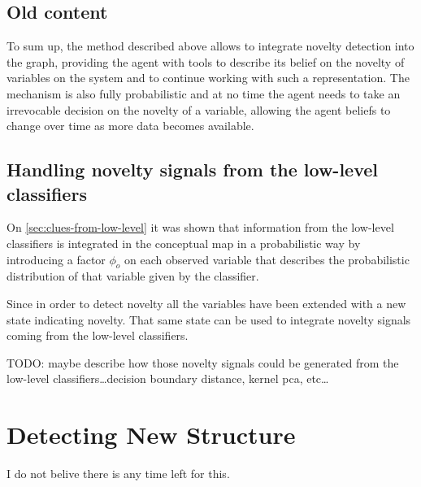 \subsection{Old content}
To sum up, the method described above allows to integrate novelty detection
into the graph, providing the agent with tools to describe its belief on the
novelty of variables on the system and to continue working with such a
representation. The mechanism is also fully probabilistic and at no time
the agent needs to take an irrevocable decision on the novelty of a variable,
allowing the agent beliefs to change over time as more data becomes available.


\subsection{Handling novelty signals from the low-level classifiers}
On \autoref{sec:clues-from-low-level} it was shown that information from the
low-level classifiers is integrated in the conceptual map in a probabilistic
way by introducing a factor $\phi_o$ on each observed variable that describes
the probabilistic distribution of that variable given by the classifier.

Since in order to detect novelty all the variables have been extended with a
new state indicating novelty. That same state can be used to integrate novelty
signals coming from the low-level classifiers.

TODO: maybe describe how those novelty signals could be generated from the
low-level classifiers\dots decision boundary distance, kernel pca, etc\dots

\section{Detecting New Structure}
I do not belive there is any time left for this.
